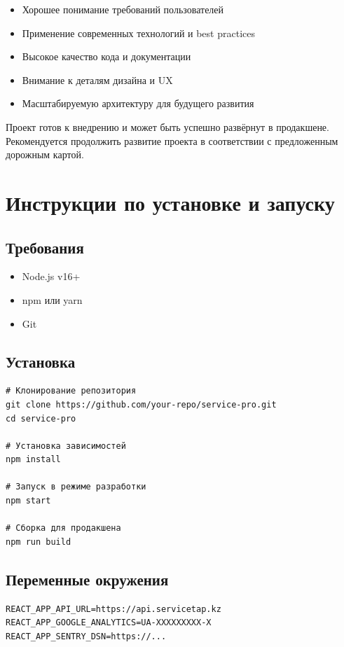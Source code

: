 \documentclass[12pt,a4paper]{report}
\begin{document}
\begin{itemize}
    \item Хорошее понимание требований пользователей
    \item Применение современных технологий и best practices
    \item Высокое качество кода и документации
    \item Внимание к деталям дизайна и UX
    \item Масштабируемую архитектуру для будущего развития
\end{itemize}

Проект готов к внедрению и может быть успешно развёрнут в продакшене. Рекомендуется продолжить развитие проекта в соответствии с предложенным дорожным картой.

\newpage

\appendix

\chapter{Инструкции по установке и запуску}

\section{Требования}
\begin{itemize}
    \item Node.js v16+
    \item npm или yarn
    \item Git
\end{itemize}

\section{Установка}
\begin{lstlisting}
# Клонирование репозитория
git clone https://github.com/your-repo/service-pro.git
cd service-pro

# Установка зависимостей
npm install

# Запуск в режиме разработки
npm start

# Сборка для продакшена
npm run build
\end{lstlisting}

\section{Переменные окружения}
\begin{lstlisting}
REACT_APP_API_URL=https://api.servicetap.kz
REACT_APP_GOOGLE_ANALYTICS=UA-XXXXXXXXX-X
REACT_APP_SENTRY_DSN=https://...
\end{lstlisting}
\end{document}
